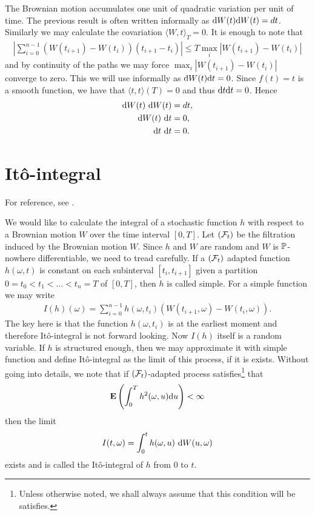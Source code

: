The Brownian motion accumulates one unit of quadratic variation per unit of time. The previous result is often written informally as $\mathrm{d} W(t) \mathrm{d} W(t) = dt$. Similarly we may calculate the covariation $\langle W, t \rangle_T = 0$. It is enough to note that
  \begin{align}
    \left| \sum_{i=0}^{n-1} (W(t_{i+1}) - W(t_i) )( t_{i+1} - t_i ) \right| \leq T \max_i \left| W(t_{i+1}) - W(t_i) \right| 
  \end{align}
and by continuity of the paths we may force $\max_i \left| W(t_{i+1}) - W(t_i) \right|$ converge to zero. This we will use informally as $\mathrm{d} W(t) \mathrm{d} t = 0$. Since $f(t) = t$ is a smooth function, we have that $\langle t, t \rangle (T) = 0$ and thus $\mathrm{d} t \mathrm{d} t = 0$. Hence
  \begin{align}
    \mathrm{d} W(t) \ \mathrm{d} W(t) &= dt, \\
    \mathrm{d} W(t) \ \mathrm{d} t &= 0, \\
    \mathrm{d} t \ \mathrm{d} t &= 0.
  \end{align}
  
\section{It\^{o}-integral}

For reference, see \textcite[pp. 21--55]{oksendal2003stochastic}.

We would like to calculate the integral of a stochastic function $h$ with respect to a Brownian motion $W$ over the time interval $[0,T]$. Let $(\mathcal{F}_t)$ be the filtration induced by the Brownian motion $W$. Since $h$ and $W$ are random and $W$ is $\mathbb{P}$-nowhere differentiable, we need to tread carefully. If a $(\mathcal{F}_t)$ adapted function $h(\omega,t)$ is constant on each subinterval $[t_i, t_{i+1}]$ given a partition $0 = t_0 < t_1 < \ldots < t_n = T$ of $[0,T]$, then $h$ is called simple. For a simple function we may write
  \begin{align}
    I(h) (\omega) = \sum_{i=0}^{n-1} h(\omega,t_i) ( W(t_{i+1}, \omega) - W(t_i, \omega) ) .
  \end{align}
The key here is that the function $h(\omega,t_i)$ is at the earliest moment and therefore It\^{o}-integral is not forward looking. Now $I(h)$ itself is a random variable. If $h$ is structured enough, then we may approximate it with simple function and define It\^{o}-integral as the limit of this process, if it is exists. Without going into details, we note that if $(\mathcal{F}_t)$-adapted process satisfies\footnote{Unless otherwise noted, we shall always assume that this condition will be satisfies.} that
  	\begin{align}
	\label{H-ito-restriction}
	\operatorname{\boldsymbol{\mathrm{E}}} \left( \int_0^T h^2 (\omega,u) \mathrm{d} u \right) < \infty
	\end{align}
then the limit 
	\begin{align}
		I(t, \omega) = \int_0^t  h (\omega,u) \ \mathrm{d} W(u, \omega)
	\end{align}
exists and is called the It\^{o}-integral of $h$ from $0$ to $t$.

